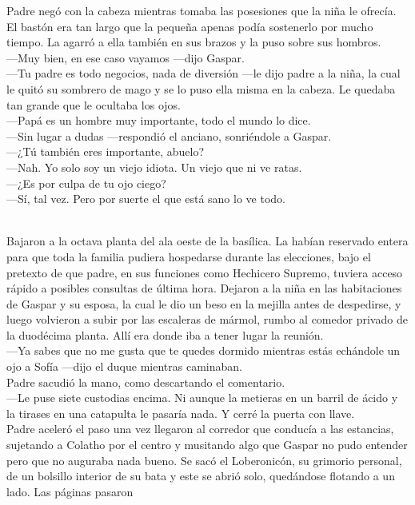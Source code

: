 \documentclass[
  letterpaper,
]{book}
\begin{document}
Padre negó con la cabeza mientras tomaba las posesiones que la niña le
ofrecía. El bastón era tan largo que la pequeña apenas podía sostenerlo
por mucho tiempo. La agarró a ella también en sus brazos y la puso sobre
sus hombros.\\
---Muy bien, en ese caso vayamos ---dijo Gaspar.\\
---Tu padre es todo negocios, nada de diversión ---le dijo padre a la
niña, la cual le quitó su sombrero de mago y se lo puso ella misma en la
cabeza. Le quedaba tan grande que le ocultaba los ojos.\\
---Papá es un hombre muy importante, todo el mundo lo dice.\\
---Sin lugar a dudas ---respondió el anciano, sonriéndole a Gaspar.\\
---¿Tú también eres importante, abuelo?\\
---Nah. Yo solo soy un viejo idiota. Un viejo que ni ve ratas.\\
---¿Es por culpa de tu ojo ciego?\\
---Sí, tal vez. Pero por suerte el que está sano lo ve todo.\\
\strut \\
Bajaron a la octava planta del ala oeste de la basílica. La habían
reservado entera para que toda la familia pudiera hospedarse durante las
elecciones, bajo el pretexto de que padre, en sus funciones como
Hechicero Supremo, tuviera acceso rápido a posibles consultas de última
hora. Dejaron a la niña en las habitaciones de Gaspar y su esposa, la
cual le dio un beso en la mejilla antes de despedirse, y luego volvieron
a subir por las escaleras de mármol, rumbo al comedor privado de la
duodécima planta. Allí era donde iba a tener lugar la reunión.\\
---Ya sabes que no me gusta que te quedes dormido mientras estás
echándole un ojo a Sofía ---dijo el duque mientras caminaban.\\
Padre sacudió la mano, como descartando el comentario.\\
---Le puse siete custodias encima. Ni aunque la metieras en un barril de
ácido y la tirases en una catapulta le pasaría nada. Y cerré la puerta
con llave.\\
Padre aceleró el paso una vez llegaron al corredor que conducía a las
estancias, sujetando a Colatho por el centro y musitando algo que Gaspar
no pudo entender pero que no auguraba nada bueno. Se sacó el
Loberonicón, su grimorio personal, de un bolsillo interior de su bata y
este se abrió solo, quedándose flotando a un lado. Las páginas pasaron
\end{document}
